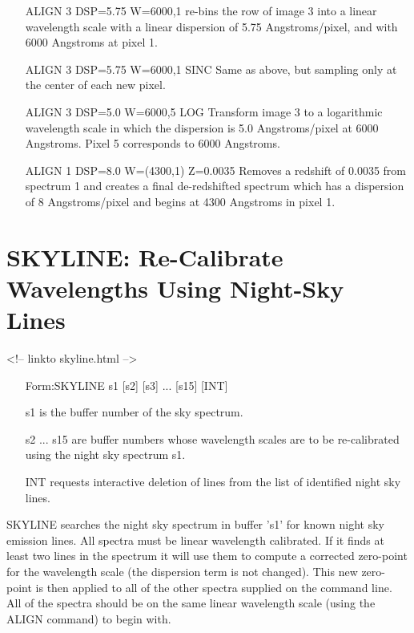 \begin{itemize} 
  \item[ALIGN 3 DSP=5.75 W=6000,1\hfill]{re-bins the row of image 3 into a
       linear wavelength scale with a linear dispersion of 5.75
       Angstroms/pixel, and with 6000 Angstroms at pixel 1.}

  \item[ALIGN 3 DSP=5.75 W=6000,1 SINC\hfill]{Same as above, but sampling
       only at the center of each new pixel.}

  \item[ALIGN 3 DSP=5.0 W=6000,5 LOG\hfill]{Transform image 3 to a
       logarithmic wavelength scale in which the dispersion is 5.0
       Angstroms/pixel at 6000 Angstroms.  Pixel 5 corresponds to 6000
       Angstroms.}

  \item[ALIGN 1 DSP=8.0 W=(4300,1) Z=0.0035\hfill]{ Removes a redshift of
       0.0035 from spectrum 1 and creates a final de-redshifted spectrum
       which has a dispersion of 8 Angstroms/pixel and begins at 4300
       Angstroms in pixel 1.}
\end{itemize}
 
\section{SKYLINE: Re-Calibrate Wavelengths Using Night-Sky Lines}
\begin{rawhtml}
<!-- linkto skyline.html -->
\end{rawhtml}
\begin{itemize}
  \item[Form:SKYLINE s1 {[s2]} {[s3]} ... {[s15]} {[INT]}\hfill]{}
  \item[s1]{is the buffer number of the sky spectrum.}
  \item[s2 ... s15]{are buffer numbers whose wavelength
       scales are to be re-calibrated using the night sky spectrum s1.}
  \item[INT]{requests interactive deletion of lines
       from the list of identified night sky lines.}
\end{itemize}

SKYLINE searches the night sky spectrum in buffer 's1' for known night sky
emission lines.  All spectra must be linear wavelength calibrated. If it
finds at least two lines in the spectrum it will use them to compute a
corrected zero-point for the wavelength scale (the dispersion term is not
changed).  This new zero-point is then applied to all of the other spectra
supplied on the command line.  All of the spectra should be on the same
linear wavelength scale (using the ALIGN command) to begin with.

